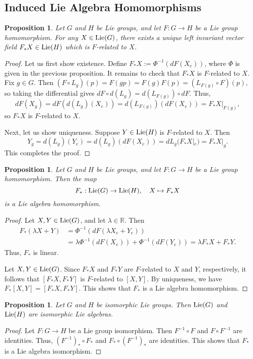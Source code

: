 \documentclass{amsart}[]
\newcommand{\R}{\mathbb R}
\newcommand{\lie}{\text{\normalfont Lie}}
\theoremstyle{plain}
\newtheorem{proposition}[theorem]{Proposition}
\theoremstyle{definition}
\theoremstyle{remark}
\begin{document}
	\subsection{Induced Lie Algebra Homomorphisms}

	\begin{proposition}
		Let $G$ and $H$ be Lie groups, and let $F:G \rightarrow H$ be a Lie group homomorphism. For any $X \in \lie(G)$, there exists a unique left invariant vector field $F_* X \in \lie(H)$ which is $F$-related to $X$.
	\end{proposition}
	\begin{proof}
		Let us first show existence. Define $F_*X := \Phi^{-1}(dF(X_e))$, where $\Phi$ is given in the previous proposition. It remains to check that $F_* X$ is $F$-related to $X$. Fix $g \in G$. Then 
		$(F \circ L_g)(p) = F(gp) = F(g) F(p) = (L_{F(g)} \circ F)(p),$
		so taking the differential gives $dF \circ d(L_g) = d(L_{F(g)}) \circ dF$. Thus, 
		$$dF(X_g) = dF(d(L_g)(X_e)) = d(L_{F(g)})(dF(X_e)) = F_* X|_{F(g)},$$
		so $F_*X$ is $F$-related to $X$.
		
		Next, let us show uniqueness. Suppose $Y \in \lie(H)$ is $F$-related to $X$. Then 
		$$Y_g = d(L_g)(Y_e) = d(L_g)(dF(X_e)) = dL_g(F_* X|_e) = F_*X|_g.$$
		This completes the proof.
	\end{proof}

	\begin{proposition}
		Let $G$ and $H$ be Lie groups, and let $F:G \rightarrow H$ be a Lie group homomorphism. Then the map 
		$$F_*: \lie(G) \rightarrow \lie(H), \quad X \mapsto F_* X$$
		is a Lie algebra homomorphism.
	\end{proposition}
	\begin{proof}
		Let $X,Y \in \lie(G)$, and let $\lambda \in \R$. Then
		\begin{align*}
			F_*(\lambda X + Y) &= \Phi^{-1}(dF(\lambda X_e + Y_e))  \\
			&= \lambda \Phi^{-1}(dF(X_e)) + \Phi^{-1}(dF(Y_e)) = \lambda F_* X + F_* Y.
		\end{align*}
		Thus, $F_*$ is linear.
		
		Let $X,Y \in \lie(G)$. Since $F_*X$ and $F_* Y$ are $F$-related to $X$ and $Y$, respectively, it follows that $[F_* X,F_* Y]$ is $F$-related to $[X,Y]$. By uniqueness, we have $F_*[X,Y] = [F_* X,F_* Y]$. This shows that $F_*$ is a Lie algebra homomorphism.
	\end{proof}

	\begin{proposition}
		Let $G$ and $H$ be isomorphic Lie groups. Then $\lie(G)$ and $\lie(H)$ are isomorphic Lie algebras.
	\end{proposition}
	\begin{proof}
		Let $F:G \rightarrow H$ be a Lie group isomorphism. Then $F^{-1} \circ F$ and $F \circ F^{-1}$ are identities. Thus, $(F^{-1})_* \circ F_*$ and $F_* \circ (F^{-1})_*$ are identities. This shows that $F_*$ is a Lie algebra isomorphism.
	\end{proof}
\end{document}
